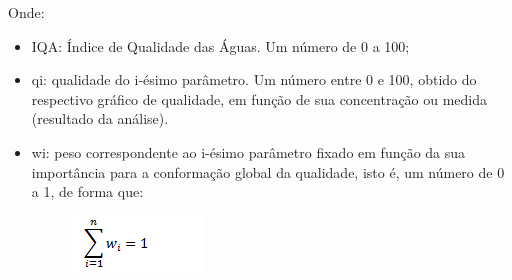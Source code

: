 \documentclass[12pt,openright,oneside,a4paper,brazil]{abntex2}
\begin{document}
Onde:
\begin{itemize}

\item IQA: Índice de Qualidade das Águas. Um número de 0 a 100;
\item qi: qualidade do i-ésimo parâmetro. Um número entre 0 e 100, obtido do respectivo gráfico de qualidade, em função de sua concentração ou medida (resultado da análise).
\item wi: peso correspondente ao i-ésimo parâmetro fixado em função da sua importância para a conformação global da qualidade, isto é,  um número de 0 a 1, de forma que:
\begin{figure}[h]
\centering
\includegraphics[scale=01]{eq2}
\end{figure}
\FloatBarrier
\end{itemize}
\end{document}
